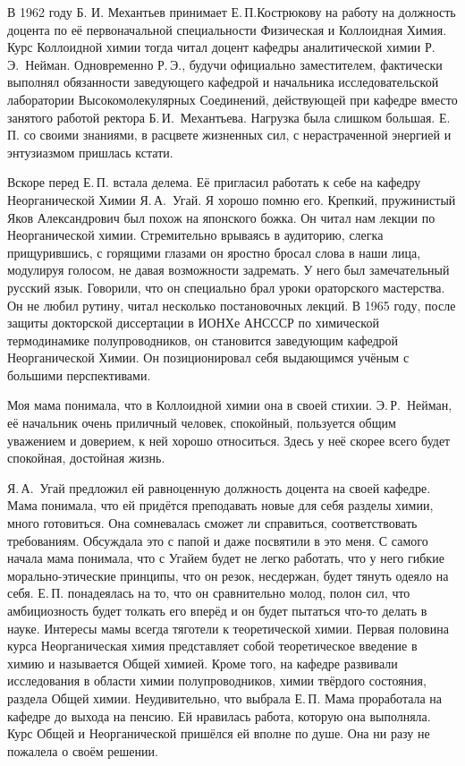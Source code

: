 В 1962 году Б. И. Механтьев принимает Е.\,П.Кострюкову на работу на должность доцента по её первоначальной специальности Физическая и Коллоидная Химия. Курс Коллоидной химии тогда читал доцент кафедры аналитической химии Р.\,Э.~Нейман. Одновременно Р.\,Э., будучи официально заместителем, фактически выполнял обязанности заведующего кафедрой и начальника исследовательской лаборатории Высокомолекулярных Соединений, действующей при кафедре вместо занятого работой ректора Б.\,И.~Механтьева. Нагрузка была слишком большая. Е.\,П. со своими знаниями, в расцвете жизненных сил, с нерастраченной энергией и энтузиазмом пришлась кстати.

Вскоре перед Е.\,П. встала делема. Её пригласил работать к себе на кафедру Неорганической Химии Я.\,А.~Угай. Я хорошо помню его. Крепкий, пружинистый Яков Александрович был похож на японского божка. Он читал нам лекции по Неорганической химии. Стремительно врываясь в аудиторию, слегка прищурившись, с горящими глазами он яростно бросал слова в наши лица, модулируя голосом, не давая возможности задремать. У него был замечательный русский язык. Говорили, что он специально брал уроки ораторского мастерства. Он не любил рутину, читал несколько постановочных лекций. В 1965 году, после защиты докторской диссертации в ИОНХе АНСССР по химической термодинамике полупроводников, он становится заведующим кафедрой Неорганической Химии. Он позиционировал себя выдающимся учёным с большими перспективами.

Моя мама понимала, что в Коллоидной химии она в своей стихии. Э.\,Р.~Нейман, её начальник очень приличный человек, спокойный, пользуется общим уважением и доверием, к ней хорошо относиться. Здесь у неё скорее всего будет спокойная, достойная жизнь.

Я.\,А.~Угай предложил ей равноценную должность доцента на своей кафедре. Мама понимала, что ей придётся преподавать новые для себя разделы химии, много готовиться. Она сомневалась сможет ли справиться, соответствовать требованиям. Обсуждала это с папой и даже посвятили в это меня. С самого начала мама понимала, что с Угайем будет не легко работать, что у него гибкие морально-этические принципы, что он резок, несдержан, будет тянуть одеяло на себя. Е.\,П. понадеялась на то, что он сравнительно молод, полон сил, что амбициозность будет толкать его вперёд и он будет пытаться что-то делать в науке. Интересы мамы всегда тяготели к теоретической химии. Первая половина курса Неорганическая химия представляет собой теоретическое введение в химию и называется Общей химией. Кроме того, на кафедре развивали исследования в области химии полупроводников, химии твёрдого состояния, раздела Общей химии. Неудивительно, что выбрала Е.\,П. Мама проработала на кафедре до выхода на пенсию. Ей нравилась работа, которую она выполняла. Курс Общей и Неорганической пришёлся ей вполне по душе. Она ни разу не пожалела о своём решении.

